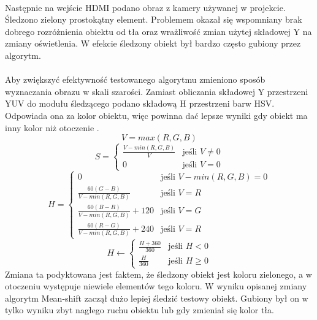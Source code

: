 \paragraph*{}
Następnie na wejście HDMI podano obraz z kamery używanej w projekcie.
Śledzono zielony prostokątny element.
Problemem okazał się wspomniany brak dobrego rozróżnienia obiektu od tła oraz wrażliwość zmian użytej składowej Y na zmiany oświetlenia.
W efekcie śledzony obiekt był bardzo często gubiony przez algorytm.

\paragraph*{}
Aby zwiększyć efektywność testowanego algorytmu zmieniono sposób wyznaczania obrazu w skali szarości. 
Zamiast obliczania składowej Y przestrzeni YUV do modułu śledzącego podano składową H przestrzeni barw HSV. 
Odpowiada ona za kolor obiektu, więc powinna dać lepsze wyniki gdy obiekt ma inny kolor niż otoczenie \cite{Kryjak}.
\begin{equation}
V=max(R,G,B)
\end{equation}
\begin{equation}
S=
	\begin{cases}
	\frac{V-min(R,G,B)}{V} &\text{jeśli } V \neq 0\\
	0 &\text{jeśli } V=0
	\end{cases}
\end{equation}
\begin{equation}
H=
	\begin{cases}
	0 &\text{jeśli } V-min(R,G,B)=0\\
	\frac{60(G-B)}{V-min(R,G,B)} &\text{jeśli } V=R\\
	\frac{60(B-R)}{V-min(R,G,B)}+120 &\text{jeśli } V=G\\
	\frac{60(R-G)}{V-min(R,G,B)}+240 &\text{jeśli } V=R
	\end{cases}
\end{equation}
\begin{equation}
H \leftarrow
	\begin{cases}
	\frac{H+360}{360} &\text{jeśli } H<0\\
	\frac{H}{360} &\text{jeśli } H \geqslant 0
	\end{cases}
\end{equation}
Zmiana ta podyktowana jest faktem, że śledzony obiekt jest koloru zielonego, a w otoczeniu występuje niewiele elementów tego koloru. W wyniku opisanej zmiany algorytm Mean-shift zaczął dużo lepiej śledzić testowy obiekt. Gubiony był on w tylko wyniku zbyt nagłego ruchu obiektu lub gdy zmieniał się kolor tła.

